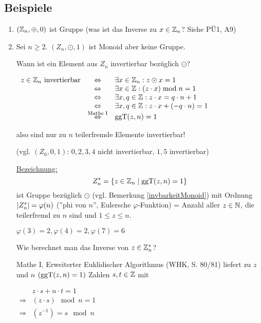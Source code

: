 \subsection{Beispiele}
\label{gruppenbeispiele}
\begin{enumerate}
	
	\item
	$(\mathbb{Z}_n, \oplus, 0)$ ist Gruppe (was ist das Inverse zu $x \in \mathbb{Z}_n$? Siehe PÜ1, A9)
	
	\item
	Sei $n \geq 2$. $(Z_n, \odot, 1)$ ist Monoid aber keine Gruppe. 
	
	Wann ist ein Element aus $Z_n$ invertierbar bezüglich $\odot$?
	
	$\begin{array}{lcl}
	z \in \mathbb{Z}_n \text{ invertierbar} 
		&\Leftrightarrow&
		\exists x \in \mathbb{Z}_n : z \odot x = 1 \\
		&\Leftrightarrow&
		 \exists x \in \mathbb{Z}: (z \cdot x) \;\mathrm{ mod }\;{n} = 1 \\
		&\Leftrightarrow&
		\exists x, q \in \mathbb{Z}: z \cdot x = q \cdot n + 1 \\
		&\Leftrightarrow&
		\exists x, q \in \mathbb{Z}: z \cdot x + (-q \cdot n) = 1 \\
		&\stackrel{\text{Mathe I}}{\Leftrightarrow}&
		\mathrm{ ggT }(z, n) = 1 
	\end{array}$
	
	also sind nur zu $n$ teilerfremde Elemente invertierbar!
	
	(vgl. $(Z_6, 0, 1)$: $0, 2, 3, 4$ nicht invertierbar, $1, 5$ invertierbar)
	
	\underline{Bezeichnung:}
	\[Z_n^* = \left\{z \in \mathbb{Z}_n \;|\; \mathrm{ ggT }(z, n) = 1\right\}\]
	ist Gruppe bezüglich $\odot$ (vgl. Bemerkung \ref{invbarkeitMonoid}) mit Ordnung $\left|Z_n^*\right|=\varphi(n)$ (''phi von $n$'', Eulersche $\varphi$-Funktion) = Anzahl aller $z \in \mathbb{N}$, die teilerfremd zu $n$ sind und $1 \leq z \leq n$.
	
	$\varphi(3) = 2, \varphi(4)=2, \varphi(7) = 6$

	Wie berechnet man das Inverse von $z \in \mathbb{Z}_n^*$?
	
	Mathe I, Erweiterter Euklidischer Algorithmus (WHK, S. 80/81) liefert zu $z$ und $n$ $(\mathrm{ ggT }(z, n) = 1)$ Zahlen $s, t \in \mathbb{Z}$ mit 
	
	$\begin{array}{cl}
	& z \cdot s + n \cdot t = 1 \\
	\Rightarrow & (z \cdot s) \mod n = 1 \\
	\Rightarrow & (z^{-1}) = s \mod n
	\end{array}$
	

\end{enumerate}
